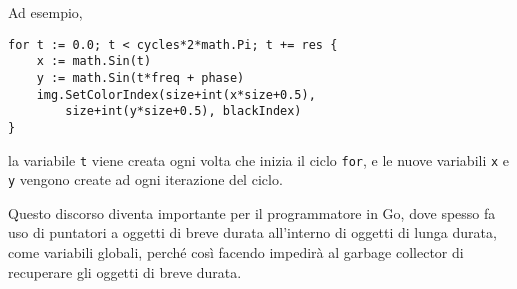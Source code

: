 Ad esempio,
\begin{lstlisting}[frame=single, label={lst:lstlisting1-3-4.1}]
for t := 0.0; t < cycles*2*math.Pi; t += res {
    x := math.Sin(t)
    y := math.Sin(t*freq + phase)
    img.SetColorIndex(size+int(x*size+0.5),
        size+int(y*size+0.5), blackIndex)
}
\end{lstlisting}
la variabile \verb|t| viene creata ogni volta che inizia il ciclo \verb|for|, e le nuove variabili \verb|x| e \verb|y| vengono create ad ogni iterazione del ciclo.

Questo discorso diventa importante per il programmatore in Go, dove spesso fa uso di puntatori a oggetti di breve durata all'interno di oggetti di lunga durata, come variabili globali, perché così facendo impedirà al garbage collector di recuperare gli oggetti di breve durata.

